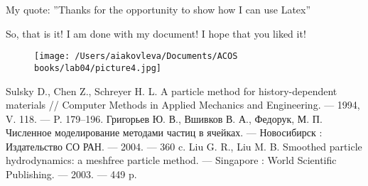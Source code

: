\documentclass[10pt,a4paper]{report}
\begin{document}
My quote: 
''Thanks for the opportunity to show how I can use Latex'' \linebreak[4]

\textit{}

\Huge 
So, that is it! I am done with my document! I hope that you liked it!
\normalsize

\begin{figure}[h]
\centering
\texttt{[image: /Users/aiakovleva/Documents/ACOS\\ books/lab04/picture4.jpg]}
\end{figure}

\clearpage

\begin{thebibliography}{3}
Sulsky D., Chen Z., Schreyer H. L.  A particle method for history-dependent materials // Computer Methods in Applied Mechanics and Engineering. --- 1994, V. 118. --- P. 179--196.
Григорьев Ю. В., Вшивков В. А., Федорук, М. П. Численное моделирование методами частиц в ячейках. --- Новосибирск : Издательство СО РАН. --- 2004. --- 360 c.
Liu G. R., Liu M. B. Smoothed particle hydrodynamics: a meshfree particle method. --- Singapore : World Scientific Publishing. --- 2003. --- 449 p.
\end{thebibliography}
\end{document}
